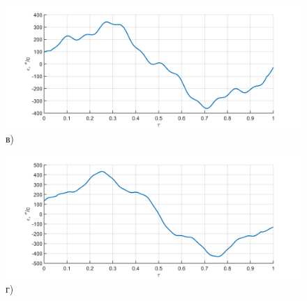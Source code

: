 \begin{figure}[h!]
	\begin{minipage}[b]{0.49\linewidth}\centering
		\includegraphics[width=\linewidth]{matlab/img/oz-gyro-sin-acc} \\ в)
	\end{minipage}
	\hfill
	\begin{minipage}[b]{0.49\linewidth}\centering
		\includegraphics[width=\linewidth]{matlab/img/oy-gyro-sin-acc} \\ г)
	\end{minipage}
	
	\vspace{0.5em} %
	

\end{figure}
